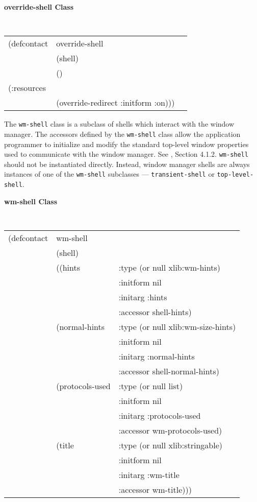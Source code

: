 {\samepage 
{\large {\bf override-shell \hfill Class}} 
\begin{flushright} \parbox[t]{6.125in}{
\tt
\begin{tabular}{lll}
\raggedright
(defcontact &override-shell\\
&  (shell)\\
&  () \\
(:resources \\
&    (override-redirect :initform :on))) 									     
\end{tabular}
\rm
}\end{flushright}}





The {\tt wm-shell} class is a subclass of shells which interact with the
window manager.  The accessors defined by the {\tt wm-shell} class allow
the application programmer to initialize and modify the standard
top-level window properties used to communicate with the window
manager. See \cite{icccm}, Section 4.1.2.
{\tt wm-shell} should not be instantiated directly.  Instead, window
manager shells are always instances of one of the {\tt wm-shell}
subclasses --- {\tt transient-shell} or {\tt top-level-shell}.

{\samepage 
{\large {\bf wm-shell \hfill Class}} 
\begin{flushright} \parbox[t]{6.125in}{
\tt
\begin{tabular}{lll}
\raggedright
(defcontact &wm-shell \\
& (shell) \\
& ((hints&                :type     (or null xlib:wm-hints) \\
&			& :initform nil  \\
&			& :initarg  :hints \\
&			& :accessor shell-hints)    \\
&   (normal-hints &        :type     (or null xlib:wm-size-hints) \\
&			& :initform nil  \\
&			& :initarg  :normal-hints \\
&			& :accessor shell-normal-hints) \\
&   (protocols-used &           :type     (or null list)  \\
&			& :initform nil  \\
&			& :initarg  :protocols-used \\
&			& :accessor wm-protocols-used) \\
&   (title   &             :type     (or null xlib:stringable) \\
&			& :initform nil  \\
&			& :initarg  :wm-title \\
&			& :accessor wm-title)))
\end{tabular}
\rm
}\end{flushright}}


